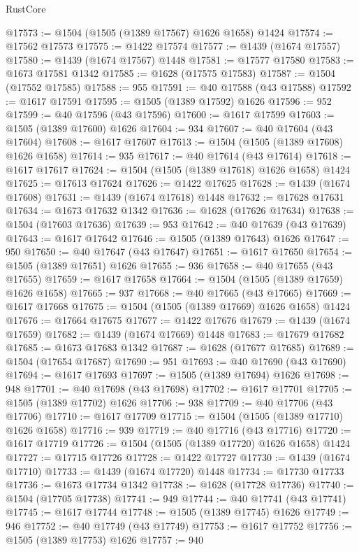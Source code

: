 \begin{lexlean}{RustCore}
\begin{coremodule}
@17573 := @1504 (@1505 (@1389 @17567) @1626 @1658) @1424
@17574 := @17562 @17573
@17575 := @1422 @17574
@17577 := @1439 (@1674 @17557)
@17580 := @1439 (@1674 @17567) @1448
@17581 := @17577 @17580
@17583 := @1673 @17581 @1342
@17585 := @1628 (@17575 @17583)
@17587 := @1504 (@17552 @17585)
@17588 := 955
@17591 := @40 @17588 (@43 @17588)
@17592 := @1617 @17591
@17595 := @1505 (@1389 @17592) @1626
@17596 := 952
@17599 := @40 @17596 (@43 @17596)
@17600 := @1617 @17599
@17603 := @1505 (@1389 @17600) @1626
@17604 := 934
@17607 := @40 @17604 (@43 @17604)
@17608 := @1617 @17607
@17613 := @1504 (@1505 (@1389 @17608) @1626 @1658)
@17614 := 935
@17617 := @40 @17614 (@43 @17614)
@17618 := @1617 @17617
@17624 := @1504 (@1505 (@1389 @17618) @1626 @1658) @1424
@17625 := @17613 @17624
@17626 := @1422 @17625
@17628 := @1439 (@1674 @17608)
@17631 := @1439 (@1674 @17618) @1448
@17632 := @17628 @17631
@17634 := @1673 @17632 @1342
@17636 := @1628 (@17626 @17634)
@17638 := @1504 (@17603 @17636)
@17639 := 953
@17642 := @40 @17639 (@43 @17639)
@17643 := @1617 @17642
@17646 := @1505 (@1389 @17643) @1626
@17647 := 950
@17650 := @40 @17647 (@43 @17647)
@17651 := @1617 @17650
@17654 := @1505 (@1389 @17651) @1626
@17655 := 936
@17658 := @40 @17655 (@43 @17655)
@17659 := @1617 @17658
@17664 := @1504 (@1505 (@1389 @17659) @1626 @1658)
@17665 := 937
@17668 := @40 @17665 (@43 @17665)
@17669 := @1617 @17668
@17675 := @1504 (@1505 (@1389 @17669) @1626 @1658) @1424
@17676 := @17664 @17675
@17677 := @1422 @17676
@17679 := @1439 (@1674 @17659)
@17682 := @1439 (@1674 @17669) @1448
@17683 := @17679 @17682
@17685 := @1673 @17683 @1342
@17687 := @1628 (@17677 @17685)
@17689 := @1504 (@17654 @17687)
@17690 := 951
@17693 := @40 @17690 (@43 @17690)
@17694 := @1617 @17693
@17697 := @1505 (@1389 @17694) @1626
@17698 := 948
@17701 := @40 @17698 (@43 @17698)
@17702 := @1617 @17701
@17705 := @1505 (@1389 @17702) @1626
@17706 := 938
@17709 := @40 @17706 (@43 @17706)
@17710 := @1617 @17709
@17715 := @1504 (@1505 (@1389 @17710) @1626 @1658)
@17716 := 939
@17719 := @40 @17716 (@43 @17716)
@17720 := @1617 @17719
@17726 := @1504 (@1505 (@1389 @17720) @1626 @1658) @1424
@17727 := @17715 @17726
@17728 := @1422 @17727
@17730 := @1439 (@1674 @17710)
@17733 := @1439 (@1674 @17720) @1448
@17734 := @17730 @17733
@17736 := @1673 @17734 @1342
@17738 := @1628 (@17728 @17736)
@17740 := @1504 (@17705 @17738)
@17741 := 949
@17744 := @40 @17741 (@43 @17741)
@17745 := @1617 @17744
@17748 := @1505 (@1389 @17745) @1626
@17749 := 946
@17752 := @40 @17749 (@43 @17749)
@17753 := @1617 @17752
@17756 := @1505 (@1389 @17753) @1626
@17757 := 940

\end{coremodule}
\end{lexlean}
